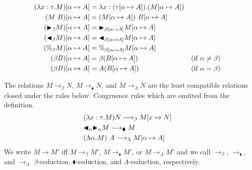 
\begin{align*}
	(\lambda x:\tau.M)[\alpha \mapsto A] & = \lambda x:(\tau[\alpha \mapsto A]).(M[\alpha \mapsto A])                                  \\
	(M\ B)[\alpha \mapsto A]             & = (M[\alpha \mapsto A])\ B[\alpha\mapsto A]                                                 \\
	({\mathop{\blacktriangleright}}_\beta M)[\alpha \mapsto A]      & = {\mathop{\blacktriangleright}}_{\beta[\alpha \mapsto A]}M[\alpha \mapsto A]                                          \\
	({\mathop{\blacktriangleleft}}_\beta M)[\alpha \mapsto A]     & = {\mathop{\blacktriangleleft}}_{\beta[\alpha \mapsto A]}M[\alpha \mapsto A]                                         \\
	(\%_\beta M)[\alpha \mapsto A]       & = \%_{\beta[\alpha \mapsto A]}M[\alpha \mapsto A]                                           \\
	(\beta B)[\alpha \mapsto A]          & = \beta (B[\alpha\mapsto A])                               & (\text{if } \alpha \neq \beta) \\
	(\beta B)[\alpha \mapsto A]          & = A (B[\alpha\mapsto A])                                   & (\text{if } \alpha = \beta)
\end{align*}

\begin{definition}[Reduction]
	The relations $M \longrightarrow_\beta N$, $M \longrightarrow_\blacklozenge N$, and $M \longrightarrow_\Lambda N$
	are the least compatible relations closed under the rules below.
	Congruence rules which are omitted from the definition.
	\begin{align*}
		 & (\lambda x:\tau.M) N \longrightarrow_\beta M[x \mapsto N]                             \\
		 & {\mathop{\blacktriangleleft}}_\alpha {\mathop{\blacktriangleright}}_\alpha M \longrightarrow_\blacklozenge M                              \\
		 & (\Lambda \alpha.M)\ A \longrightarrow_\Lambda M[\alpha \mapsto A]
	\end{align*}
	We write $ M \longrightarrow M'$ iff $ M \longrightarrow_\beta M'$, $ M \longrightarrow_\blacklozenge M'$, or $ M \longrightarrow_\Lambda M'$ and
	we call $\longrightarrow_\beta$, $\longrightarrow_\blacklozenge$, and $\longrightarrow_\Lambda$ $\beta$-reduction, $\blacklozenge$-reduction, and $\Lambda$-reduction, respectively.
\end{definition}

